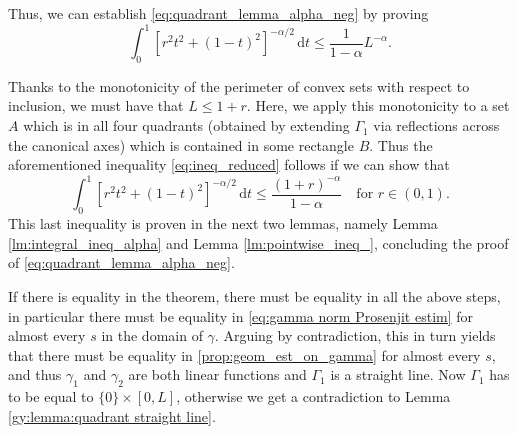 \documentclass[10pt,leqno]{amsart}
\makeatletter
\newcommand{\dd}{\, \mathrm{d}}
\numberwithin{Theorem}{section}
\theoremstyle{definition}
\theoremstyle{remark}
\numberwithin{equation}{section}
\numberwithin{equation}{section}
\newenvironment{customproof}[1]{%
  \par\pushQED{\qed}%
  \normalfont\topsep6pt \trivlist
  \item[\hskip\labelsep\itshape
    Proof of #1\@addpunct{.}]\ignorespaces
}{%
  \popQED\endtrivlist\@endpefalse
}
\makeatother
\begin{document}
\begin{customproof}{Theorem \ref{thm:intro:alpha and n is 1}}
Thus, we can establish \eqref{eq:quadrant_lemma_alpha_neg} by proving
\begin{equation} \label{eq:ineq_reduced}
\int_0^1 \left[ r^2t^2 +(1-t)^2 \right]^{-\alpha/2} \dd t \leq \frac{1}{1-\alpha}L^{-\alpha}.
\end{equation}

Thanks to the monotonicity of the perimeter of convex sets with respect to inclusion, we must have that $L\leq 1+r$. Here, we apply this monotonicity to a set $A$ which is in all four quadrants (obtained by extending $\Gamma_1$ via reflections across the canonical axes) which is contained in some rectangle $B$.
Thus the aforementioned inequality \eqref{eq:ineq_reduced} follows if we can show that
$$\int_0^1 \left[ r^2t^2 +(1-t)^2 \right]^{-\alpha/2} \dd t \leq \frac{(1+r)^{-\alpha}}{1-\alpha} \quad \text{for }r \in (0,1).$$
This last inequality is proven in the next two lemmas, namely  Lemma \ref{lm:integral_ineq_alpha} and Lemma \ref{lm:pointwise_ineq_}, concluding the proof of \eqref{eq:quadrant_lemma_alpha_neg}.


If there is equality in the theorem, there must be equality in all the above steps, in particular there must be equality in \eqref{eq:gamma norm Prosenjit estim} for almost every $s$ in the domain of $\gamma.$ Arguing by contradiction, this in turn yields that there must be equality in \eqref{prop:geom_est_on_gamma} for almost every $s$, and thus $\gamma_1$ and $\gamma_2$ are both linear functions and $\Gamma_1$ is a straight line. Now $\Gamma_1$ has to be equal to $\{0\} \times [0,L]$, otherwise we get a contradiction to Lemma \ref{gy:lemma:quadrant straight line}. 
\end{customproof}
\end{document}
